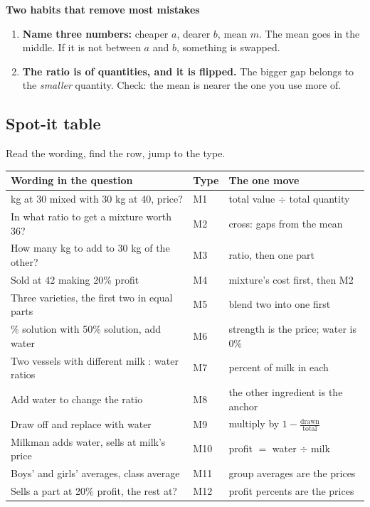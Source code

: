 \documentclass[11pt,a4paper]{article}
\let\oldsubsection\subsection
\renewcommand{\subsection}{\needspace{9\baselineskip}\oldsubsection}
\newcommand{\infobox}[2]{\par\medskip\noindent\begingroup\setlength{\fboxsep}{7pt}%
  \colorbox{codebg}{\parbox{\dimexpr\linewidth-14pt\relax}{\textbf{\color{ember}#1}\par\smallskip #2}}\endgroup\par\medskip}
\begin{document}
\infobox{Two habits that remove most mistakes}{
\begin{enumerate}
\item \textbf{Name three numbers:} cheaper $a$, dearer $b$, mean $m$. The mean goes in the middle. If it is not between $a$ and $b$, something is swapped.
\item \textbf{The ratio is of quantities, and it is flipped.} The bigger gap belongs to the \emph{smaller} quantity. Check: the mean is nearer the one you use more of.
\end{enumerate}}

\subsection*{Spot-it table}
Read the wording, find the row, jump to the type.
\begin{center}\small\renewcommand{\arraystretch}{1.18}\setlength{\tabcolsep}{7pt}
\begin{tabularx}{\linewidth}{@{}>{\raggedright\arraybackslash}X l >{\raggedright\arraybackslash}X@{}}
\toprule
\textbf{\color{slate}Wording in the question} & \textbf{\color{slate}Type} & \textbf{\color{slate}The one move} \\ \midrule
20 kg at 30 mixed with 30 kg at 40, price? & M1 & total value $\div$ total quantity \\
In what ratio to get a mixture worth 36? & M2 & cross: gaps from the mean \\
How many kg to add to 30 kg of the other? & M3 & ratio, then one part \\
Sold at 42 making 20\% profit & M4 & mixture's cost first, then M2 \\
Three varieties, the first two in equal parts & M5 & blend two into one first \\
20\% solution with 50\% solution, add water & M6 & strength is the price; water is 0\% \\
Two vessels with different milk : water ratios & M7 & percent of milk in each \\
Add water to change the ratio & M8 & the other ingredient is the anchor \\
Draw off and replace with water & M9 & multiply by $1-\frac{\text{drawn}}{\text{total}}$ \\
Milkman adds water, sells at milk's price & M10 & profit $=$ water $\div$ milk \\
Boys' and girls' averages, class average & M11 & group averages are the prices \\
Sells a part at 20\% profit, the rest at? & M12 & profit percents are the prices \\
\bottomrule
\end{tabularx}\end{center}
\end{document}
